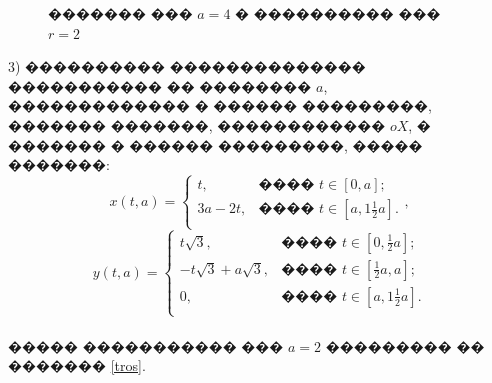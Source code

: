 \documentclass[a4paper]{article}
\begin{document}
        \begin{figure}[h!]
          \noindent{}
          \caption{������� ��� $a=4$ � ���������� ��� $r=2$}
          \label{kvci}
        \end{figure}

  3) ���������� �������������� ����������� �� �������� $a$, ������������� � ������ ���������, ������� �������, ������������ $oX$, � ������� � ������ ���������, ����� �������:
        \[
          x(t,a) =
          \begin{cases}
            t,     & \text{���� $t \in [0,a]$;}             \\
            3a-2t, & \text{���� $t \in [a,1\frac{1}{2}a]$.} \\
          \end{cases},
        \]
        \[y(t,a) =
          \begin{cases}
            t \sqrt{3},            & \text{���� $t \in [0,\frac{1}{2}a]$;}  \\
            -t \sqrt{3}+a\sqrt{3}, & \text{���� $t \in [\frac{1}{2}a,a]$;}  \\
            0,                     & \text{���� $t \in [a,1\frac{1}{2}a]$.} \\
          \end{cases}
        \]
        \\
        ����� ����������� ��� $a=2$ ��������� �� ������� \ref{tros}.
\end{document}
